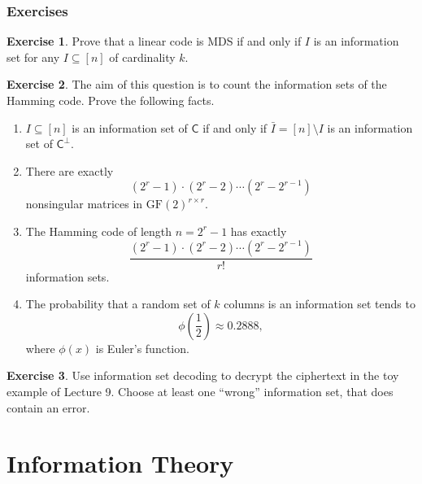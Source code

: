 \documentclass[a4paper, 11pt, openany]{book}
\numberwithin{equation}{section}
\theoremstyle{plain}
\theoremstyle{definition}
\newtheorem{exercise}   {Exercise}  [section]
\newcommand{\GF}{\mathrm{GF}}
\newcommand{\code}[1]{\mathsf{#1}}
\begin{document}
\subsection{Exercises}



\begin{exercise}
Prove that a linear code is MDS if and only if $I$ is an information set for any $I \subseteq [n]$ of cardinality $k$.
\end{exercise}



\begin{exercise}
The aim of this question is to count the information sets of the Hamming code. Prove the following facts.
\begin{enumerate}
	\item $I \subseteq [n]$ is an information set of $\code{C}$ if and only if $\bar{I} = [n] \setminus I$ is an information set of $\code{C}^\perp$.
	
	\item There are exactly
	\[
		(2^r - 1) \cdot (2^r - 2) \cdots (2^r - 2^{r-1})
	\]
	nonsingular matrices in $\GF(2)^{r \times r}$.
	
	\item The Hamming code of length $n = 2^r - 1$ has exactly
	\[
		\frac{ (2^r - 1) \cdot (2^r - 2) \cdots (2^r - 2^{r-1}) }{ r! }
	\]
	information sets.
	
	\item The probability that a random set of $k$ columns is an information set tends to
	\[
		\phi\left( \frac{1}{2} \right) \approx 0.2888,
	\]
	where $\phi(x)$ is Euler's function.
\end{enumerate}
\end{exercise}


\begin{exercise}
Use information set decoding to decrypt the ciphertext in the toy example of Lecture 9. Choose at least one ``wrong'' information set, that does contain an error.
\end{exercise}









\chapter{Information Theory}
\end{document}
